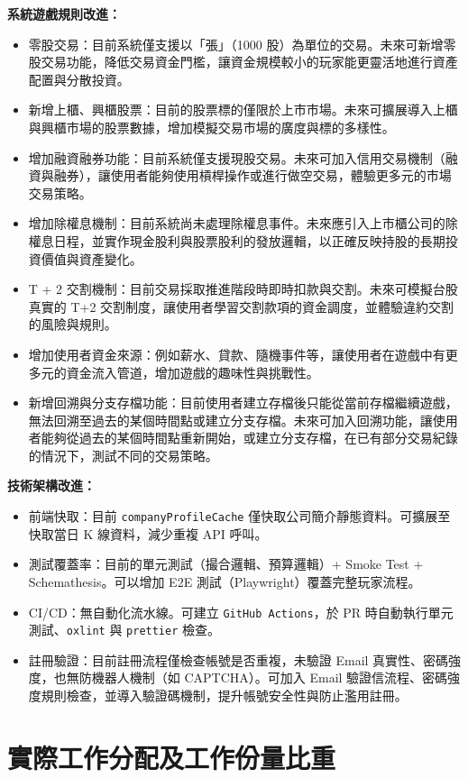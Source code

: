 \documentclass[UTF8, a4paper, 12pt, fontset=none]{ctexart}
\begin{document}
\textbf{系統遊戲規則改進：}
\begin{itemize}
    \item 零股交易：目前系統僅支援以「張」（1000 股）為單位的交易。未來可新增零股交易功能，降低交易資金門檻，讓資金規模較小的玩家能更靈活地進行資產配置與分散投資。
    \item 新增上櫃、興櫃股票：目前的股票標的僅限於上市市場。未來可擴展導入上櫃與興櫃市場的股票數據，增加模擬交易市場的廣度與標的多樣性。
    \item 增加融資融券功能：目前系統僅支援現股交易。未來可加入信用交易機制（融資與融券），讓使用者能夠使用槓桿操作或進行做空交易，體驗更多元的市場交易策略。
    \item 增加除權息機制：目前系統尚未處理除權息事件。未來應引入上市櫃公司的除權息日程，並實作現金股利與股票股利的發放邏輯，以正確反映持股的長期投資價值與資產變化。
    \item T + 2 交割機制：目前交易採取推進階段時即時扣款與交割。未來可模擬台股真實的 T+2 交割制度，讓使用者學習交割款項的資金調度，並體驗違約交割的風險與規則。
    \item 增加使用者資金來源：例如薪水、貸款、隨機事件等，讓使用者在遊戲中有更多元的資金流入管道，增加遊戲的趣味性與挑戰性。
    \item 新增回溯與分支存檔功能：目前使用者建立存檔後只能從當前存檔繼續遊戲，無法回溯至過去的某個時間點或建立分支存檔。未來可加入回溯功能，讓使用者能夠從過去的某個時間點重新開始，或建立分支存檔，在已有部分交易紀錄的情況下，測試不同的交易策略。
\end{itemize}

\textbf{技術架構改進：}
\begin{itemize}
    \item 前端快取：目前 \texttt{companyProfileCache} 僅快取公司簡介靜態資料。可擴展至快取當日 K 線資料，減少重複 API 呼叫。
    \item 測試覆蓋率：目前的單元測試（撮合邏輯、預算邏輯）+ Smoke Test + Schemathesis。可以增加 E2E 測試（Playwright）覆蓋完整玩家流程。
    \item CI/CD：無自動化流水線。可建立 \texttt{GitHub Actions}，於 PR 時自動執行單元測試、\texttt{oxlint} 與 \texttt{prettier} 檢查。
    \item 註冊驗證：目前註冊流程僅檢查帳號是否重複，未驗證 Email 真實性、密碼強度，也無防機器人機制（如 CAPTCHA）。可加入 Email 驗證信流程、密碼強度規則檢查，並導入驗證碼機制，提升帳號安全性與防止濫用註冊。
\end{itemize}

\section{實際工作分配及工作份量比重}
\end{document}
